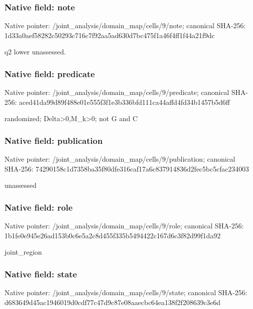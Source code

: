\documentclass[10pt,a4paper]{article}
\begin{document}
\subsubsection{Native field: note}
Native pointer: /joint\_\allowbreak{}analysis/domain\_\allowbreak{}map/cells/9/note; canonical SHA-256: 1d33a0aef58282c50293c716c7f92aa5ad630d7bc475f1a46f4ff1f44a21f9dc

\begingroup\raggedright\sloppy q2 lower unassessed.\par\endgroup

\subsubsection{Native field: predicate}
Native pointer: /joint\_\allowbreak{}analysis/domain\_\allowbreak{}map/cells/9/predicate; canonical SHA-256: aced41da99d89f488e01e555f3f1e3b336bfd111ca44affd4fd34b1457b5d6ff

\begingroup\raggedright\sloppy randomized;\allowbreak{} Delta>0,\allowbreak{}M\_\allowbreak{}k>0;\allowbreak{} not G and C\par\endgroup

\subsubsection{Native field: publication}
Native pointer: /joint\_\allowbreak{}analysis/domain\_\allowbreak{}map/cells/9/publication; canonical SHA-256: 74290158c1d7358ba35f80dfe316caf17a6c837914836d2fec5bc5cfac234003

\begingroup\raggedright\sloppy unassessed\par\endgroup

\subsubsection{Native field: role}
Native pointer: /joint\_\allowbreak{}analysis/domain\_\allowbreak{}map/cells/9/role; canonical SHA-256: 1b1fe0e945e26ad153b0c6e5a2c8d455f335b5494422c167d6c3f82d99f1da92

\begingroup\raggedright\sloppy joint\_\allowbreak{}region\par\endgroup

\subsubsection{Native field: state}
Native pointer: /joint\_\allowbreak{}analysis/domain\_\allowbreak{}map/cells/9/state; canonical SHA-256: d683649d45ac1946019d0cdf77c47d9c87e08aaecbc64ea138f2f208639c3e6d
\end{document}
